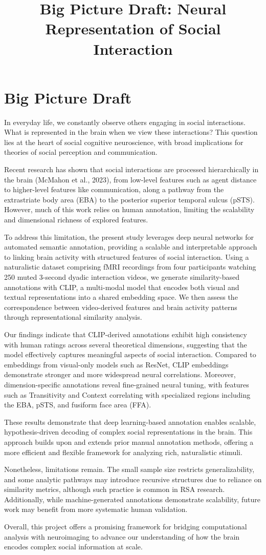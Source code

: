 \documentclass[man]{apa7}
\title{Big Picture Draft: Neural Representation of Social Interaction}
\author{}
\affiliation{}
\begin{document}
\section{Big Picture Draft}

In everyday life, we constantly observe others engaging in social interactions. What is represented in the brain when we view these interactions? This question lies at the heart of social cognitive neuroscience, with broad implications for theories of social perception and communication.

Recent research has shown that social interactions are processed hierarchically in the brain (McMahon et al., 2023), from low-level features such as agent distance to higher-level features like communication, along a pathway from the extrastriate body area (EBA) to the posterior superior temporal sulcus (pSTS). However, much of this work relies on human annotation, limiting the scalability and dimensional richness of explored features.

To address this limitation, the present study leverages deep neural networks for automated semantic annotation, providing a scalable and interpretable approach to linking brain activity with structured features of social interaction. Using a naturalistic dataset comprising fMRI recordings from four participants watching 250 muted 3-second dyadic interaction videos, we generate similarity-based annotations with CLIP, a multi-modal model that encodes both visual and textual representations into a shared embedding space. We then assess the correspondence between video-derived features and brain activity patterns through representational similarity analysis.

Our findings indicate that CLIP-derived annotations exhibit high consistency with human ratings across several theoretical dimensions, suggesting that the model effectively captures meaningful aspects of social interaction. Compared to embeddings from visual-only models such as ResNet, CLIP embeddings demonstrate stronger and more widespread neural correlations. Moreover, dimension-specific annotations reveal fine-grained neural tuning, with features such as Transitivity and Context correlating with specialized regions including the EBA, pSTS, and fusiform face area (FFA).

These results demonstrate that deep learning-based annotation enables scalable, hypothesis-driven decoding of complex social representations in the brain. This approach builds upon and extends prior manual annotation methods, offering a more efficient and flexible framework for analyzing rich, naturalistic stimuli.

Nonetheless, limitations remain. The small sample size restricts generalizability, and some analytic pathways may introduce recursive structures due to reliance on similarity metrics, although such practice is common in RSA research. Additionally, while machine-generated annotations demonstrate scalability, future work may benefit from more systematic human validation.

Overall, this project offers a promising framework for bridging computational analysis with neuroimaging to advance our understanding of how the brain encodes complex social information at scale.
\end{document}
